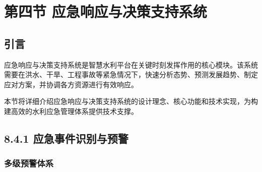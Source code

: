 \section{第四节
应急响应与决策支持系统}\label{ux7b2cux56dbux8282-ux5e94ux6025ux54cdux5e94ux4e0eux51b3ux7b56ux652fux6301ux7cfbux7edf}

\subsection{引言}\label{ux5f15ux8a00}

应急响应与决策支持系统是智慧水利平台在关键时刻发挥作用的核心模块。该系统需要在洪水、干旱、工程事故等紧急情况下，快速分析态势、预测发展趋势、制定应对方案，并协调各方资源进行有效响应。

本节将详细介绍应急响应与决策支持系统的设计理念、核心功能和技术实现，为构建高效的水利应急管理体系提供技术支撑。

\subsection{8.4.1
应急事件识别与预警}\label{ux5e94ux6025ux4e8bux4ef6ux8bc6ux522bux4e0eux9884ux8b66}

\subsubsection{多级预警体系}\label{ux591aux7ea7ux9884ux8b66ux4f53ux7cfb}

